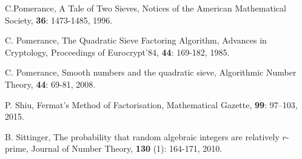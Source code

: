 \documentclass[12pt]{amsart}
\theoremstyle{definition}
\begin{document}
\begin{thebibliography}{1}
 C.Pomerance, A Tale of Two Sieves, Notices of the American Mathematical Society, \textbf{36}: 1473-1485, 1996. %

 C. Pomerance, The Quadratic Sieve Factoring Algorithm, Advances in Cryptology, Proceedings of Eurocrypt’84, \textbf{44}: 169-182, 1985. %

 C. Pomerance, Smooth numbers and the quadratic sieve, Algorithmic Number Theory, \textbf{44}: 69-81, 2008. %

 P. Shiu, Fermat’s Method of Factorisation, Mathematical Gazette, \textbf{99}: 97–103, 2015. %

 B. Sittinger, The probability that random algebraic integers are relatively $r$-prime, Journal of Number Theory, \textbf{130} (1): 164-171, 2010.


\end{thebibliography}
\end{document}
